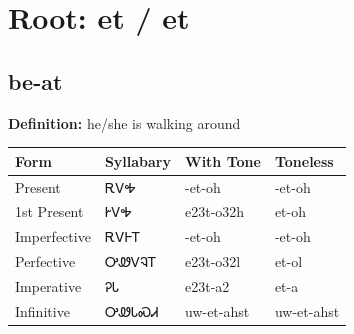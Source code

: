 \documentclass{article}%
\begin{document}
%
\normalsize%
\section*{Root: et / et}%
\subsection*{be-at}%
\textbf{Definition: }%
he/she is walking around%
\\[0.5em]%
\begin{tabular}{|l|l|l|l|}%
\hline%
\textbf{Form}&\textbf{Syllabary}&\textbf{With Tone}&\textbf{Toneless}\\%
\hline%
Present&ᎡᏙᎭ&{-}et{-}oh&{-}et{-}oh\\%
1st Present&ᎨᏙᎭ&e23t{-}o32h&et{-}oh\\%
Imperfective&ᎡᏙᎰᎢ&{-}et{-}oh&{-}et{-}oh\\%
Perfective&ᎤᏪᏙᎸᎢ&e23t{-}o32l&et{-}ol\\%
Imperative&ᎮᏓ&e23t{-}a2&et{-}a\\%
Infinitive&ᎤᏪᏓᏍᏗ&uw{-}et{-}ahst&uw{-}et{-}ahst\\%
\hline%
\end{tabular}%
\\[1em]%
\end{document}
